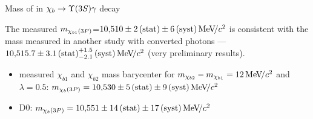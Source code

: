 \begin{frame}{Mass of \chiboneThreeP in $\chib \to \Y3S \gamma$ decay}

The measured
$m_{\chi_{b 1}(3P)}$=\textcolor{red}{$10{,}510\pm2\mathrm{\,(stat)}\pm6\mathrm{\,(syst)}{\mathrm{\,Me\kern -0.1em V\!/}c^2}$} is
consistent with the mass measured in another study with converted photons ---
\textcolor{blue}{$10{,}515.7\pm3.1\mathrm{\,(stat)}^{+1.5}_{-2.1}\mathrm{\,(syst)}{\mathrm{\,Me\kern -0.1em V\!/}c^2}$} (very
preliminary results).

\begin{itemize}
\item \atlas measured $\chi_{b1}$ and $\chi_{b2}$  mass barycenter for $m_{\chi_{b2}} - m_{\chi_{b1}}=12{\mathrm{\,Me\kern -0.1em V\!/}c^2}$ and $\lambda=0.5$:
\textcolor{blue}{$m_{\chi_{b}(3P)} = 10{,}530\pm5\mathrm{\,(stat)}\pm9\mathrm{\,(syst)}{\mathrm{\,Me\kern -0.1em V\!/}c^2}$}
\item D0: \textcolor{blue}{$m_{\chi_{b}(3P)} = 10{,}551\pm14\mathrm{\,(stat)}\pm17\mathrm{\,(syst)}{\mathrm{\,Me\kern -0.1em V\!/}c^2}$}
\end{itemize}
\end{frame}
